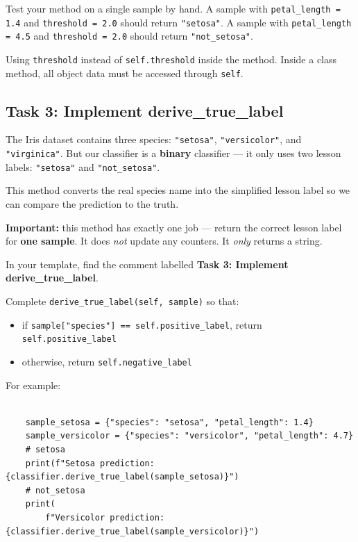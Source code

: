 \begin{tcolorbox}[title=Checkpoint]
Test your method on a single sample by hand.
A sample with \texttt{petal\_length = 1.4} and \texttt{threshold = 2.0} should return \texttt{"setosa"}.
A sample with \texttt{petal\_length = 4.5} and \texttt{threshold = 2.0} should return \texttt{"not\_setosa"}.
\end{tcolorbox}

\begin{tcolorbox}[title=Common Mistake]
Using \texttt{threshold} instead of \texttt{self.threshold} inside the method.
Inside a class method, all object data must be accessed through \texttt{self}.
\end{tcolorbox}

\subsection{Task 3: Implement derive\_true\_label}

\begin{tcolorbox}[title=Task 3: Implement derive\_true\_label]
The Iris dataset contains three species: \texttt{"setosa"}, \texttt{"versicolor"}, and \texttt{"virginica"}.
But our classifier is a \textbf{binary} classifier --- it only uses two lesson labels: \texttt{"setosa"} and \texttt{"not\_setosa"}.

\medskip
\noindent
This method converts the real species name into the simplified lesson label so we can compare the prediction to the truth.

\medskip
\noindent
\textbf{Important:} this method has exactly one job --- return the correct lesson label for \textbf{one sample}.
It does \textit{not} update any counters. It \textit{only} returns a string.

\medskip
\noindent
In your template, find the comment labelled \textbf{Task 3: Implement derive\_true\_label}.

Complete \texttt{derive\_true\_label(self, sample)} so that:
\begin{itemize}\setlength{\itemsep}{2pt}
    \item if \texttt{sample["species"] == self.positive\_label}, return \texttt{self.positive\_label}
    \item otherwise, return \texttt{self.negative\_label}
\end{itemize}
\end{tcolorbox}

\noindent
For example:

\begin{verbatim}

    sample_setosa = {"species": "setosa", "petal_length": 1.4}
    sample_versicolor = {"species": "versicolor", "petal_length": 4.7}
    # setosa
    print(f"Setosa prediction: {classifier.derive_true_label(sample_setosa)}")
    # not_setosa
    print(
        f"Versicolor prediction: {classifier.derive_true_label(sample_versicolor)}")


\end{verbatim}


